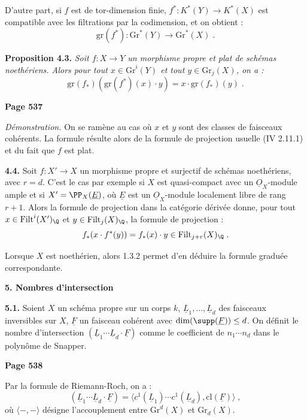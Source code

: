D'autre part, si $f$ est de tor-dimension finie, $f^* : K^*(Y) \longrightarrow K^*(X)$ est compatible avec les filtrations par la codimension, et on obtient :
\[
\mathrm{gr}(f^*) : \mathrm{Gr}^*(Y) \longrightarrow \mathrm{Gr}^*(X)\;.
\]

\smallskip
\noindent\textbf{Proposition 4.3.} \textit{Soit $f : X \longrightarrow Y$ un morphisme propre et plat de sch\'emas noeth\'eriens. Alors pour tout $x \in \mathrm{Gr}^i(Y)$ et tout $y \in \mathrm{Gr}_j(X)$, on a :
\[
\mathrm{gr}(f_*)(\mathrm{gr}(f^*)(x) \cdot y) = x \cdot \mathrm{gr}(f_*)(y)\;.
\]}

\newpage
\noindent\textbf{Page 537}

\textit{D\'emonstration.} On se ram\`ene au cas o\`u $x$ et $y$ sont des classes de faisceaux coh\'erents. La formule r\'esulte alors de la formule de projection usuelle (IV 2.11.1) et du fait que $f$ est plat.

\smallskip
\noindent\textbf{4.4.} Soit $f : X' \longrightarrow X$ un morphisme propre et surjectif de sch\'emas noeth\'eriens, avec $r = d$. C'est le cas par exemple si $X$ est quasi-compact avec un $\underline{O}_X$-module ample et si $X' = \PP_X(\underline{E})$, o\`u $\underline{E}$ est un $\underline{O}_X$-module localement libre de rang $r+1$. Alors la formule de projection dans la cat\'egorie d\'eriv\'ee donne, pour tout $x \in \mathrm{Filt}^i(X')_\Q$ et $y \in \mathrm{Filt}_j(X)_\Q$, la formule de projection :
\[
f_*(x \cdot f^*(y)) = f_*(x) \cdot y \in \mathrm{Filt}_{j+r}(X)_\Q\;.
\]

Lorsque $X$ est noeth\'erien, alors 1.3.2 permet d'en d\'eduire la formule gradu\'ee correspondante.

\medskip
\noindent\textbf{5. Nombres d'intersection}

\smallskip
\noindent\textbf{5.1.} Soient $X$ un sch\'ema propre sur un corps $k$, $\underline{L}_1, \ldots, \underline{L}_d$ des faisceaux inversibles sur $X$, $\underline{F}$ un faisceau coh\'erent avec $\dim(\supp(\underline{F})) \leq d$. On d\'efinit le nombre d'intersection $(\underline{L}_1 \cdots \underline{L}_d \cdot \underline{F})$ comme le coefficient de $n_1 \cdots n_d$ dans le polyn\^ome de Snapper.

\newpage
\noindent\textbf{Page 538}

Par la formule de Riemann-Roch, on a :
\[
(\underline{L}_1 \cdots \underline{L}_d \cdot \underline{F}) = \langle c^1(\underline{L}_1) \cdots c^1(\underline{L}_d), \mathrm{cl}(\underline{F}) \rangle\;,
\]
o\`u $\langle -, - \rangle$ d\'esigne l'accouplement entre $\mathrm{Gr}^d(X)$ et $\mathrm{Gr}_d(X)$.

